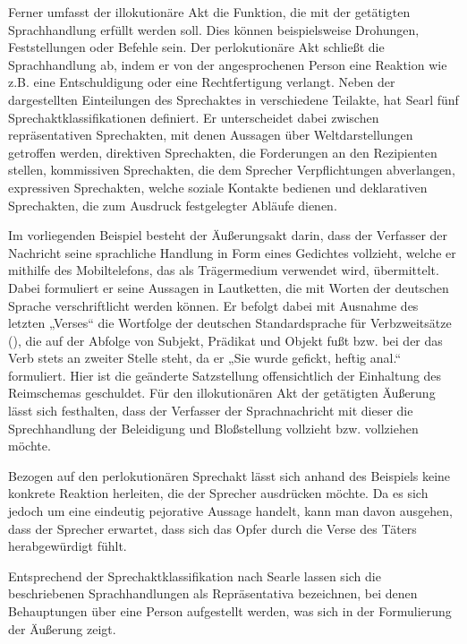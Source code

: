 Ferner umfasst der illokutionäre Akt die Funktion, die mit der getätigten Sprachhandlung erfüllt werden soll.
Dies können beispielsweise Drohungen, Feststellungen oder Befehle sein.
Der perlokutionäre Akt schließt die Sprachhandlung ab, indem er von der angesprochenen Person eine Reaktion wie z.B. eine Entschuldigung oder eine Rechtfertigung verlangt.
Neben der dargestellten Einteilungen des Sprechaktes in verschiedene Teilakte, hat Searl fünf Sprechaktklassifikationen definiert.
Er unterscheidet dabei zwischen repräsentativen Sprechakten, mit denen Aussagen über Weltdarstellungen getroffen werden, direktiven Sprechakten, die Forderungen an den Rezipienten stellen, kommissiven Sprechakten, die dem Sprecher Verpflichtungen abverlangen, expressiven Sprechakten, welche soziale Kontakte bedienen und deklarativen Sprechakten, die zum Ausdruck festgelegter Abläufe dienen. \cite[S.\,218]{AL04}

Im vorliegenden Beispiel besteht der Äußerungsakt darin, dass der Verfasser der Nachricht seine sprachliche Handlung in Form eines Gedichtes vollzieht, welche er mithilfe des Mobiltelefons, das als Trägermedium verwendet wird, übermittelt.
Dabei formuliert er seine Aussagen in Lautketten, die mit Worten der deutschen Sprache verschriftlicht werden können.
Er befolgt dabei mit Ausnahme des letzten „Verses“ die Wortfolge der deutschen Standardsprache für Verbzweitsätze (\cite[S.\,398]{PE06}), die auf der Abfolge von Subjekt, Prädikat und Objekt fußt bzw. bei der das Verb stets an zweiter Stelle steht, da er „Sie wurde gefickt, heftig anal.“ formuliert.
Hier ist die geänderte Satzstellung offensichtlich der Einhaltung des Reimschemas geschuldet.
Für den illokutionären Akt der getätigten Äußerung lässt sich festhalten, dass der Verfasser der Sprachnachricht mit dieser die Sprechhandlung der Beleidigung und Bloßstellung vollzieht bzw. vollziehen möchte.

Bezogen auf den perlokutionären Sprechakt lässt sich anhand des Beispiels keine konkrete Reaktion herleiten, die der Sprecher ausdrücken möchte.
Da es sich jedoch um eine eindeutig pejorative Aussage handelt, kann man davon ausgehen, dass der Sprecher erwartet, dass sich das Opfer durch die Verse des Täters herabgewürdigt fühlt.

Entsprechend der Sprechaktklassifikation nach Searle lassen sich die beschriebenen Sprachhandlungen als Repräsentativa bezeichnen, bei denen Behauptungen über eine Person aufgestellt werden, was sich in der Formulierung der Äußerung zeigt.
